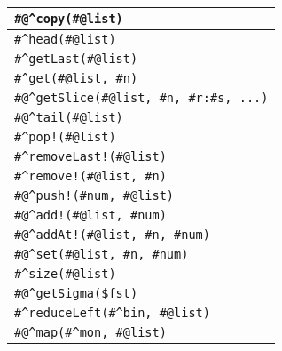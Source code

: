 \begin{tabular}{|l|}
\hline
\verb!#@^copy(#@list)! \\
\hline
\verb!#^head(#@list)! \\
\verb!#^getLast(#@list)! \\
\verb!#^get(#@list, #n)! \\
\verb!#@^getSlice(#@list, #n, #r:#s, ...)! \\
\verb!#@^tail(#@list)! \\
\hline
\verb+#^pop!(#@list)+ \\
\verb+#^removeLast!(#@list)+ \\
\verb+#^remove!(#@list, #n)+ \\
\hline
\verb+#@^push!(#num, #@list)+ \\
\verb+#@^add!(#@list, #num)+ \\
\verb+#@^addAt!(#@list, #n, #num)+ \\
\hline
\verb!#@^set(#@list, #n, #num)! \\
\hline
\verb!#^size(#@list)! \\
\verb!#@^getSigma($fst)! \\
\hline
\verb!#^reduceLeft(#^bin, #@list)! \\
\hline
\verb!#@^map(#^mon, #@list)! \\
\hline

\end{tabular}


